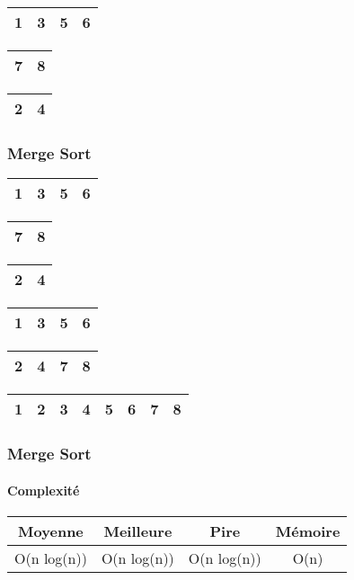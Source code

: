 \begin{frame}
\begin{table}
\begin{tabular}{| c | c | c | c |}
\hline
1 & 3 & 5 & 6 \\ 
\hline
\end{tabular}
\quad
\begin{tabular}{| c | c |}
\hline
7 & 8 \\ 
\hline
\end{tabular}
\quad
\begin{tabular}{| c | c |}
\hline
\cellcolor{blue!25}2 & \cellcolor{blue!25}4 \\ 
\hline
\end{tabular}
\end{table}
\end{frame}


\begin{frame}
\frametitle{Merge Sort}
\begin{table}
\begin{tabular}{| c | c | c | c |}
\hline
1 & 3 & 5 & 6 \\ 
\hline
\end{tabular}
\quad
\begin{tabular}{| c | c |}
\hline
7 & 8 \\ 
\hline
\end{tabular}
\quad
\begin{tabular}{| c | c |}
\hline
\cellcolor{blue!25}2 & \cellcolor{blue!25}4 \\ 
\hline
\end{tabular}
\end{table}

\begin{table}
\begin{tabular}{| c | c | c | c |}
\hline
1 & 3 & 5 & 6\\ 
\hline
\end{tabular}
\quad
\begin{tabular}{| c | c | c | c |}
\hline
\cellcolor{blue!25}2 & \cellcolor{blue!25}4 & \cellcolor{blue!25}7 & \cellcolor{blue!25}8 \\ 
\hline
\end{tabular}
\end{table}

\begin{table}
\begin{tabular}{| c | c | c | c | c | c | c | c |}
\hline
\cellcolor{blue!25}1 & \cellcolor{blue!25}2 & \cellcolor{blue!25}3 & \cellcolor{blue!25}4 & \cellcolor{blue!25}5 & \cellcolor{blue!25}6 & \cellcolor{blue!25}7 & \cellcolor{blue!25}8 \\ 
\hline
\end{tabular}
\end{table}
\end{frame}

\begin{frame}
\frametitle{Merge Sort}
\framesubtitle{Complexité}
\begin{table}
\begin{tabular}{| c | c | c | c |}
\hline
Moyenne & Meilleure & Pire & Mémoire\\ 
\hline
O(n log(n)) & O(n log(n)) & O(n log(n)) & O(n)\\
\hline
\end{tabular}
\end{table}
\end{frame}